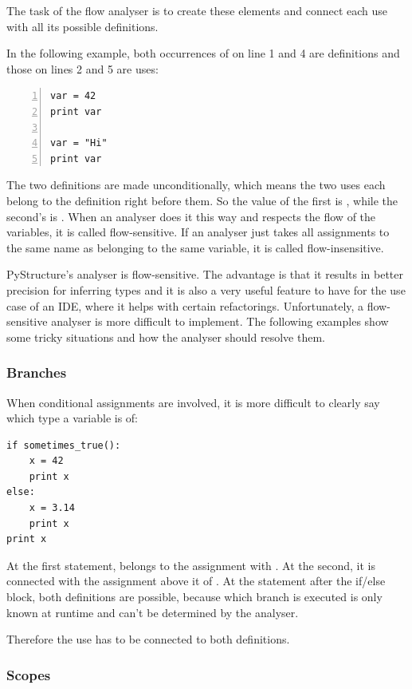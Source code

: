 \documentclass[12pt,halfparskip,DIV11,BCOR10mm]{scrreprt}
\begin{document}
The task of the flow analyser is to create these elements and connect each use with all its possible definitions.

In the following example, both occurrences of  on line 1 and 4 are definitions and those on lines 2 and 5 are uses:

\begin{lstlisting}[numbers=left]
var = 42
print var

var = "Hi"
print var
\end{lstlisting}

The two definitions are made unconditionally, which means the two uses each belong to the definition right before them. So the value of the first  is , while the second's is . When an analyser does it this way and respects the flow of the variables, it is called flow-sensitive. If an analyser just takes all assignments to the same name as belonging to the same variable, it is called flow-insensitive.

PyStructure's analyser is flow-sensitive. The advantage is that it results in better precision for inferring types and it is also a very useful feature to have for the use case of an IDE, where it helps with certain refactorings. Unfortunately, a flow-sensitive analyser is more difficult to implement. The following examples show some tricky situations and how the analyser should resolve them.

\subsubsection{Branches}

When conditional assignments are involved, it is more difficult to clearly say which type a variable is of:

\begin{lstlisting}
if sometimes_true():
    x = 42
    print x
else:
    x = 3.14
    print x
print x
\end{lstlisting}

At the first  statement,  belongs to the assignment with . At the second, it is connected with the assignment above it of . At the  statement after the if/else block, both definitions are possible, because which branch is executed is only known at runtime and can't be determined by the analyser. 

Therefore the use has to be connected to both definitions.

\subsubsection{Scopes}
\end{document}
